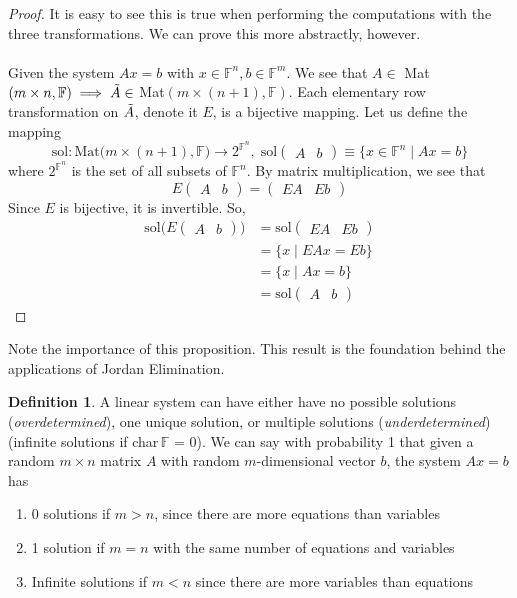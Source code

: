 \documentclass{article}
\theoremstyle{remark}
\theoremstyle{definition}
\newtheorem{definition}{Definition}[section]
\begin{document}
\begin{proof}
It is easy to see this is true when performing the computations with the three transformations. We can prove this more abstractly, however. 
\\
\\
Given the system $A x = b$ with $x \in \mathbb{F}^n, b \in \mathbb{F}^m$. We see that $A \in $ Mat$(m \times n, \mathbb{F}) \implies \Tilde{A} \in$ Mat$(m \times (n+1), \mathbb{F})$. Each elementary row transformation on $\Tilde{A}$, denote it $E$, is a bijective mapping. Let us define the mapping 
\[\text{sol}: \text{Mat}\big( m \times (n+1), \mathbb{F} \big) \longrightarrow 2^{\mathbb{F}^n}, \; \text{sol} \begin{pmatrix}
A & b
\end{pmatrix} \equiv \{ x\in \mathbb{F}^n \; | \; A x = b\} \]
where $2^{\mathbb{F}^n}$ is the set of all subsets of $\mathbb{F}^n$. By matrix multiplication, we see that 
\[ E \begin{pmatrix}
A & b
\end{pmatrix} = \begin{pmatrix}
E A & E b
\end{pmatrix}\]
Since $E$ is bijective, it is invertible. So, 
\begin{align*} 
\text{sol} \big( E \begin{pmatrix}
A & b \end{pmatrix} \big) & = \text{sol} \begin{pmatrix}
E A & E b \end{pmatrix} \\ 
& = \{ x \; | \; E A x = E b\} \\ 
& = \{ x \; | \; A x = b\} \\ 
& = \text{sol} \begin{pmatrix} A & b \end{pmatrix}
\end{align*}
\end{proof}

Note the importance of this proposition. This result is the foundation behind the applications of Jordan Elimination.

\begin{definition}
A linear system can have either have no possible solutions (\textit{overdetermined}), one unique solution, or multiple solutions (\textit{underdetermined}) (infinite solutions if char$\, \mathbb{F}$ = 0). We can say with probability 1 that given a random $m \times n$ matrix $A$ with random $m$-dimensional vector $b$, the system $A x = b$ has
\begin{enumerate}
    \item 0 solutions if $m > n$, since there are more equations than variables
    \item 1 solution if $m = n$ with the same number of equations and variables
    \item Infinite solutions if $m < n$ since there are more variables than equations
\end{enumerate}
\end{definition}
\end{document}
